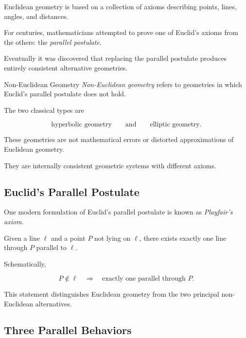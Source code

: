 Euclidean geometry is based on a collection of axioms describing points,
lines, angles, and distances.

For centuries, mathematicians attempted to prove one of Euclid's axioms from
the others: the \emph{parallel postulate}.

Eventually it was discovered that replacing the parallel postulate produces
entirely consistent alternative geometries.

\begin{definitionbox}{Non-Euclidean Geometry}
\emph{Non-Euclidean geometry} refers to geometries in which Euclid's
parallel postulate does not hold.

The two classical types are

\[
\boxed{
\text{hyperbolic geometry}
\qquad\text{and}\qquad
\text{elliptic geometry}.
}
\]
\end{definitionbox}

These geometries are not mathematical errors or distorted approximations of
Euclidean geometry.

They are internally consistent geometric systems with different axioms.

\subsection{Euclid's Parallel Postulate}
\label{subsec:euclid-parallel-postulate}

One modern formulation of Euclid's parallel postulate is known as
\emph{Playfair's axiom}.

\begin{importantbox}
Given a line \(\ell\) and a point \(P\) not lying on \(\ell\), there exists
exactly one line through \(P\) parallel to \(\ell\).
\end{importantbox}

Schematically,

\[
\boxed{
P\notin\ell
\quad\Longrightarrow\quad
\text{exactly one parallel through }P.
}
\]

This statement distinguishes Euclidean geometry from the two principal
non-Euclidean alternatives.

\subsection{Three Parallel Behaviors}
\label{subsec:three-parallel-behaviors}

